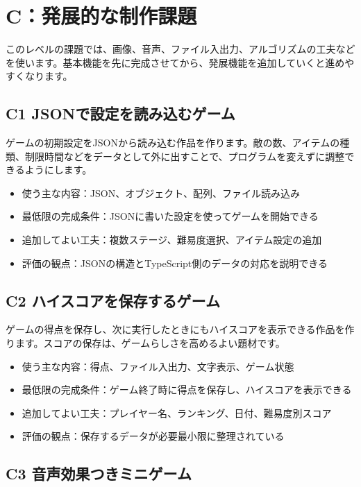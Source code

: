 \section{C：発展的な制作課題}

このレベルの課題では、画像、音声、ファイル入出力、アルゴリズムの工夫などを使います。基本機能を先に完成させてから、発展機能を追加していくと進めやすくなります。

\subsection{C1 JSONで設定を読み込むゲーム}

ゲームの初期設定をJSONから読み込む作品を作ります。敵の数、アイテムの種類、制限時間などをデータとして外に出すことで、プログラムを変えずに調整できるようにします。

\begin{itemize}
    \item 使う主な内容：JSON、オブジェクト、配列、ファイル読み込み
    \item 最低限の完成条件：JSONに書いた設定を使ってゲームを開始できる
    \item 追加してよい工夫：複数ステージ、難易度選択、アイテム設定の追加
    \item 評価の観点：JSONの構造とTypeScript側のデータの対応を説明できる
\end{itemize}

\subsection{C2 ハイスコアを保存するゲーム}

ゲームの得点を保存し、次に実行したときにもハイスコアを表示できる作品を作ります。スコアの保存は、ゲームらしさを高めるよい題材です。

\begin{itemize}
    \item 使う主な内容：得点、ファイル入出力、文字表示、ゲーム状態
    \item 最低限の完成条件：ゲーム終了時に得点を保存し、ハイスコアを表示できる
    \item 追加してよい工夫：プレイヤー名、ランキング、日付、難易度別スコア
    \item 評価の観点：保存するデータが必要最小限に整理されている
\end{itemize}

\subsection{C3 音声効果つきミニゲーム}


